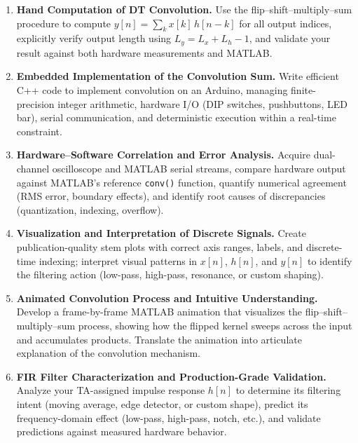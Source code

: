 \documentclass[11pt,letterpaper]{article}
\begin{document}
\begin{enumerate}
    \item \textbf{Hand Computation of DT Convolution.} Use the flip--shift--multiply--sum procedure to compute $y[n] = \sum_{k} x[k]\,h[n-k]$ for all output indices, explicitly verify output length using $L_y = L_x + L_h - 1$, and validate your result against both hardware measurements and MATLAB.

    \item \textbf{Embedded Implementation of the Convolution Sum.} Write efficient C++ code to implement convolution on an Arduino, managing finite-precision integer arithmetic, hardware I/O (DIP switches, pushbuttons, LED bar), serial communication, and deterministic execution within a real-time constraint.

    \item \textbf{Hardware--Software Correlation and Error Analysis.} Acquire dual-channel oscilloscope and MATLAB serial streams, compare hardware output against MATLAB's reference \texttt{conv()} function, quantify numerical agreement (RMS error, boundary effects), and identify root causes of discrepancies (quantization, indexing, overflow).

    \item \textbf{Visualization and Interpretation of Discrete Signals.} Create publication-quality stem plots with correct axis ranges, labels, and discrete-time indexing; interpret visual patterns in $x[n]$, $h[n]$, and $y[n]$ to identify the filtering action (low-pass, high-pass, resonance, or custom shaping).

    \item \textbf{Animated Convolution Process and Intuitive Understanding.} Develop a frame-by-frame MATLAB animation that visualizes the flip--shift--multiply--sum process, showing how the flipped kernel sweeps across the input and accumulates products. Translate the animation into articulate explanation of the convolution mechanism.

    \item \textbf{FIR Filter Characterization and Production-Grade Validation.} Analyze your TA-assigned impulse response $h[n]$ to determine its filtering intent (moving average, edge detector, or custom shape), predict its frequency-domain effect (low-pass, high-pass, notch, etc.), and validate predictions against measured hardware behavior.
\end{enumerate}

\clearpage
\end{document}
